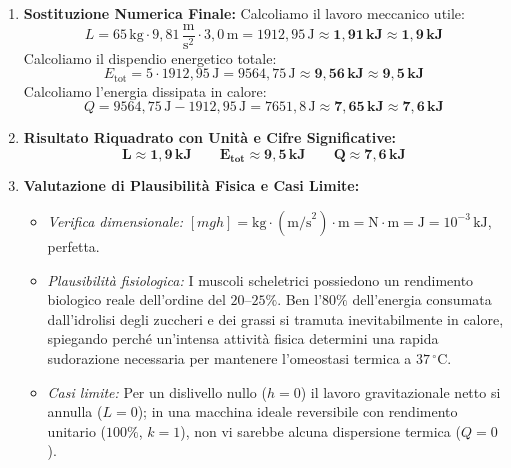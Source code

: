 \documentclass[11pt,a4paper,oneside]{report}
\begin{document}
\begin{problema}
\begin{enumerate}[label=\textbf{Fase \arabic*:}, leftmargin=*, itemsep=5pt]
  \item \textbf{Sostituzione Numerica Finale:}
  Calcoliamo il lavoro meccanico utile:
  \[
  L = 65\,\text{kg} \cdot 9{,}81\,\frac{\text{m}}{\text{s}^2} \cdot 3{,}0\,\text{m} = 1912{,}95\,\text{J} \approx \mathbf{1{,}91\,\text{kJ}} \approx \mathbf{1{,}9\,\text{kJ}}
  \]
  Calcoliamo il dispendio energetico totale:
  \[
  E_{\text{tot}} = 5 \cdot 1912{,}95\,\text{J} = 9564{,}75\,\text{J} \approx \mathbf{9{,}56\,\text{kJ}} \approx \mathbf{9{,}5\,\text{kJ}}
  \]
  Calcoliamo l'energia dissipata in calore:
  \[
  Q = 9564{,}75\,\text{J} - 1912{,}95\,\text{J} = 7651{,}8\,\text{J} \approx \mathbf{7{,}65\,\text{kJ}} \approx \mathbf{7{,}6\,\text{kJ}}
  \]

  \item \textbf{Risultato Riquadrato con Unit\`a e Cifre Significative:}
  \[
  \mathbf{\boxed{L \approx 1{,}9\,\text{kJ}}} \qquad \mathbf{\boxed{E_{\text{tot}} \approx 9{,}5\,\text{kJ}}} \qquad \mathbf{\boxed{Q \approx 7{,}6\,\text{kJ}}}
  \]

  \item \textbf{Valutazione di Plausibilit\`a Fisica e Casi Limite:}
  \begin{itemize}[leftmargin=*, label=\textbullet]
    \item \textit{Verifica dimensionale:} $[mgh] = \text{kg} \cdot (\text{m/s}^2) \cdot \text{m} = \text{N} \cdot \text{m} = \text{J} = 10^{-3}\,\text{kJ}$, perfetta.
    \item \textit{Plausibilit\`a fisiologica:} I muscoli scheletrici possiedono un rendimento biologico reale dell'ordine del $20\text{--}25\%$. Ben l'$80\%$ dell'energia consumata dall'idrolisi degli zuccheri e dei grassi si tramuta inevitabilmente in calore, spiegando perch\'e un'intensa attivit\`a fisica determini una rapida sudorazione necessaria per mantenere l'omeostasi termica a $37\,{^\circ}\text{C}$.
    \item \textit{Casi limite:} Per un dislivello nullo ($h = 0$) il lavoro gravitazionale netto si annulla ($L = 0$); in una macchina ideale reversibile con rendimento unitario ($100\%$, $k = 1$), non vi sarebbe alcuna dispersione termica ($Q = 0$).
  \end{itemize}
\end{enumerate}
\end{problema}
\end{document}
